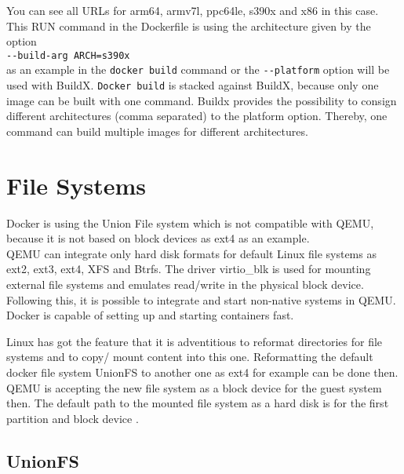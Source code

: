 You can see all URLs for arm64, armv7l, ppc64le, s390x and x86 in this case. This RUN command in the Dockerfile is using the architecture given by the option \\
\lstinline!--build-arg ARCH=s390x! \\
as an example in the \lstinline!docker build! command or the \lstinline!--platform! option will be used with BuildX.
\lstinline!Docker build! is stacked against BuildX, because only one image can be built with one command.
Buildx provides the possibility to consign different architectures (comma separated) to the platform option. Thereby, one command can build multiple images for different architectures.

\section{File Systems}\label{FileSystems}

Docker is using the Union File system which is not compatible with \gls{QEMU}, because it is not based on block devices as ext4 as an example. \\
\gls{QEMU} can integrate only hard disk formats for default Linux file systems as ext2, ext3, ext4, XFS and Btrfs. 
The driver virtio\_blk is used for mounting external file systems and emulates read/write in the physical block device\cite{Barboza2018}. Following this, it is possible to integrate and start non-native systems in \gls{QEMU}. 
Docker is capable of setting up and starting containers fast. 

Linux has got the feature that it is adventitious to reformat directories for file systems and to copy/ mount content into this one. Reformatting the default docker file system UnionFS to another one as ext4 for example can be done then. \\
\gls{QEMU} is accepting the new file system as a block device for the guest system then. The default path to the mounted file system as a hard disk is  for the first partition and block device \cite[~p.22]{White2020}.

\subsection{UnionFS}\label{UnionFS}

